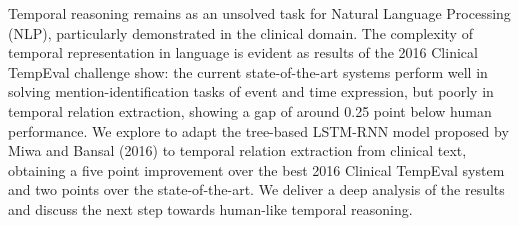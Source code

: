 Temporal reasoning remains as an unsolved task for Natural Language Processing (NLP), particularly demonstrated in the clinical domain. The complexity of temporal representation in language is evident as results of the 2016 Clinical TempEval challenge show: the current state-of-the-art systems perform well in solving mention-identification tasks of event and time expression, but poorly in temporal relation extraction, showing a gap of around 0.25 point below human performance. We explore to  adapt the tree-based LSTM-RNN model proposed by Miwa and Bansal (2016) to temporal relation extraction from clinical text, obtaining a five point improvement over the best 2016 Clinical TempEval system and two points over the state-of-the-art. We deliver a deep analysis of the results and discuss the next step towards human-like temporal reasoning.
